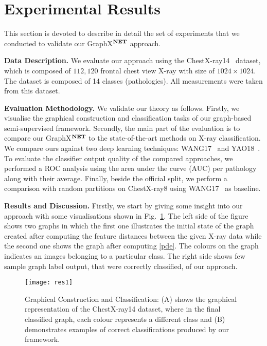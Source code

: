 \documentclass[runningheads]{llncs}
\begin{document}
\section{Experimental Results}
This section is devoted to describe in detail the set of experiments that we conducted to validate our GraphX$^{\textbf{\scriptsize NET}}$ approach. \medskip





\noindent
\textbf{Data Description.} We evaluate our approach using the ChestX-ray14~\cite{wang2017chestx} dataset, which is composed of $112,120$ frontal chest view X-ray with size of $1024\times 1024$. The dataset is composed of 14 classes (pathologies).  All measurements were taken from this dataset.

\medskip
\noindent
\textbf{Evaluation Methodology.} We validate our theory as follows. Firstly, we visualise the graphical construction and classification tasks of our graph-based semi-supervised framework. Secondly, the main part of the evaluation is to compare our GraphX$^{\textbf{\scriptsize NET}}$  to the state-of-the-art  methods on X-ray classification. We compare ours against two deep learning techniques: WANG17~\cite{wang2017chestx} and YAO18~\cite{yao2018weakly}. To evaluate the classifier output quality of the compared approaches, we performed a ROC analysis using the area under the curve (AUC) per pathology along with their average. Finally, beside the official split, we perform a comparison with random partitions on ChestX-ray8 using WANG17~\cite{wang2017chestx} as baseline.

\medskip
\noindent
\textbf{Results and Discussion.} Firstly, we start by giving some insight into our approach with some visualisations shown in Fig.~\ref{fig::res2}. The left side of the figure shows two graphs in which the first one illustrates the initial state of the graph created after computing the feature distances between the given X-ray data while the second one shows the graph after computing \eqref{pde}. The colours on the graph indicates an images belonging to a particular class. The right side shows few sample graph label output, that were correctly classified, of our approach.


\begin{figure}[t!]
\centering
\texttt{[image: res1]}
\caption{Graphical Construction and Classification: (A) shows the graphical representation of the ChestX-ray14 dataset, where in the final classified graph, each colour represents a different class and (B) demonstrates examples of correct classifications produced by our framework.}
\label{fig::res2}
\end{figure}
\end{document}
